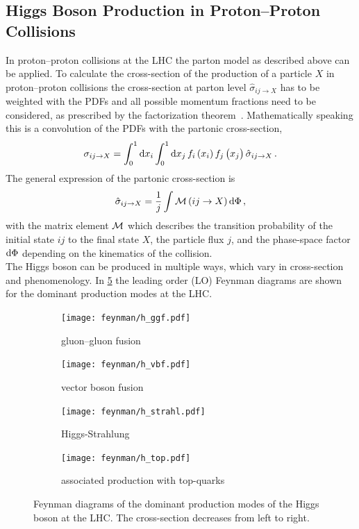 \subsection{Higgs Boson Production in Proton--Proton Collisions}\label{sub:theory:higgs:production}

In proton--proton collisions at the LHC the parton model as described above can be applied.
To calculate the cross-section of the production of a particle $X$ in proton--proton collisions the
cross-section at parton level $\hat{\sigma}_{ij\to X}$ has to be weighted with the PDFs and all
possible momentum fractions need to be considered, as prescribed by the factorization theorem~\cite{DRELL1971578}.
Mathematically speaking this is a convolution of the PDFs with the partonic cross-section,
\begin{equation}
    \sigma_{ij\to X} = \int_{0}^{1} \dif x_i \int_{0}^{1} \dif x_j \,
    f_i \left( x_i \right ) f_j \left( x_j \right ) \hat{\sigma}_{ij\to X} \,.
\end{equation}
The general expression of the partonic cross-section is~\cite{Griffiths}
\begin{equation}
    \hat{\sigma}_{ij\to X} = \frac{1}{j} \int \matrixm \left(ij \to X \right) \dif \Phi \,,
\end{equation}
with the matrix element $\mathcal{M}$ which describes the transition probability of the initial state $ij$ to the final state $X$, the
particle flux $j$, and the phase-space factor $\dif \Phi$ depending on the kinematics of the collision.
\\[\baselineskip]
The Higgs boson can be produced in multiple ways, which vary in cross-section and phenomenology.
In \cref{fig:theory:higgs:production} the leading order (LO) Feynman diagrams are shown for the dominant production modes
at the LHC\@.

\begin{figure}[htb]
    \centering
    \begin{subfigure}[t]{0.302\textwidth}
        \texttt{[image: feynman/h\_ggf.pdf]}
        \caption{gluon--gluon fusion}\label{fig:theory:higgs:ggf}
    \end{subfigure}
    \begin{subfigure}[t]{0.201\textwidth}
        \captionsetup{justification=raggedright}
        \texttt{[image: feynman/h\_vbf.pdf]}
        \caption{vector boson fusion}\label{fig:theory:higgs:vbf}
    \end{subfigure}
    \begin{subfigure}[t]{0.201\textwidth}
        \texttt{[image: feynman/h\_strahl.pdf]}
        \caption{Higgs-Strahlung}\label{fig:theory:higgs:vh}
    \end{subfigure}
    \begin{subfigure}[t]{0.246\textwidth}
        \captionsetup{justification=raggedright}
        \texttt{[image: feynman/h\_top.pdf]}
        \caption{associated \mbox{production} with top-quarks}\label{fig:theory:higgs:tassoc}
    \end{subfigure}
    \caption{Feynman diagrams of the dominant production modes of the Higgs boson at the LHC\@. The cross-section
             decreases from left to right.}\label{fig:theory:higgs:production}
\end{figure}

